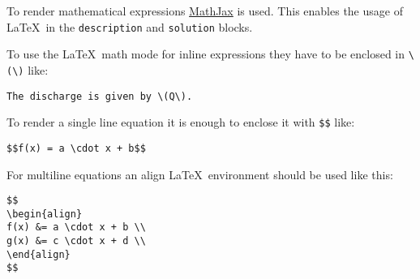 To render mathematical expressions \href{https://www.mathjax.org/}{MathJax} is
used. This enables the usage of \LaTeX\ in the \verb+description+ and
\verb+solution+ blocks.

To use the \LaTeX\ math mode for inline expressions they have to be enclosed in \verb+\(\)+ like:

\begin{lstlisting}
The discharge is given by \(Q\).
\end{lstlisting}

To render a single line equation it is enough to enclose it with \verb+$$+ like:

\begin{lstlisting}
$$f(x) = a \cdot x + b$$
\end{lstlisting}

For multiline equations an align \LaTeX\ environment should be used like this:

\begin{lstlisting}
$$
\begin{align}
f(x) &= a \cdot x + b \\
g(x) &= c \cdot x + d \\
\end{align}
$$
\end{lstlisting}
